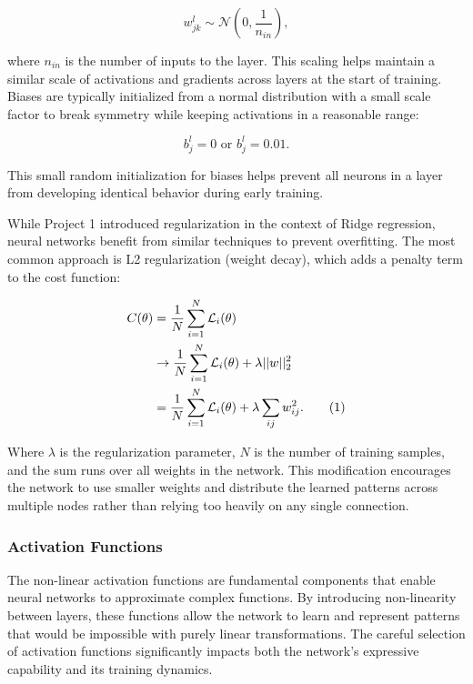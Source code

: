 \documentclass[aps,pra,english,notitlepage,reprint,nofootinbib]{revtex4-1}  %
\newcommand\numberthis{\addtocounter{equation}{1}\tag{\theequation}}
\begin{document}
\begin{equation}
    w_{jk}^l \sim \mathcal{N}\left(0, \frac{1}{n_{in}}\right),
\end{equation}

where $n_{in}$ is the number of inputs to the layer. This scaling helps maintain a similar scale of activations and gradients across layers at the start of training.  Biases are typically initialized from a normal distribution with a small scale factor to break symmetry while keeping activations in a reasonable range:

\begin{equation}
    b_j^l = 0 \text{ or } b_j^l = 0.01.
\end{equation}

This small random initialization for biases helps prevent all neurons in a layer from developing identical behavior during early training.

While Project 1 introduced regularization in the context of Ridge regression, neural networks benefit from similar techniques to prevent overfitting. The most common approach is L2 regularization (weight decay), which adds a penalty term to the cost function:

\begin{align*}
    C(\theta) &= \frac{1}{N} \sum_{i=1}^{N} \mathcal{L}_i(\theta) \\
    &\rightarrow \frac{1}{N} \sum_{i=1}^{N} \mathcal{L}_i(\theta) + \lambda||w||_2^2 \\
    &= \frac{1}{N} \sum_{i=1}^{N} \mathcal{L}_i(\theta) + \lambda \sum_{ij}w_{ij}^2. \numberthis \label{reg}
\end{align*}

Where $\lambda$ is the regularization parameter, $N$ is the number of training samples, and the sum runs over all weights in the network. This modification encourages the network to use smaller weights and distribute the learned patterns across multiple nodes rather than relying too heavily on any single connection.

\subsubsection{Activation Functions}\label{sec:activation_functions}

The non-linear activation functions are fundamental components that enable neural networks to approximate complex functions. By introducing non-linearity between layers, these functions allow the network to learn and represent patterns that would be impossible with purely linear transformations. The careful selection of activation functions significantly impacts both the network's expressive capability and its training dynamics.
\end{document}
